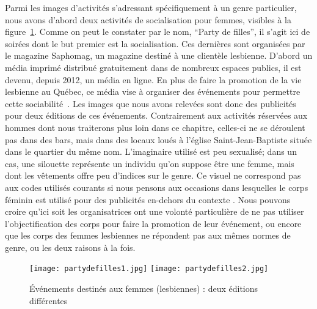 Parmi les images d'activités s'adressant spécifiquement à un genre particulier, nous avons d'abord deux activités de socialisation pour femmes, visibles à la figure~\ref{figs:partydefilles}.
Comme on peut le constater par le nom, \enquote{Party de filles}, il s'agit ici de soirées dont le but premier est la socialisation.
Ces dernières sont organisées par le magazine Saphomag, un magazine destiné à une clientèle lesbienne.
D'abord un média imprimé distribué gratuitement dans de nombreux espaces publics, il est devenu, depuis 2012, un média en ligne.
En plus de faire la promotion de la vie lesbienne au Québec, ce média vise à organiser des événements pour permettre cette sociabilité~\citep{Saphomag2016}.
Les images que nous avons relevées sont donc des publicités pour deux éditions de ces événements.
Contrairement aux activités réservées aux hommes dont nous traiterons plus loin dans ce chapitre, celles-ci ne se déroulent pas dans des bars, mais dans des locaux loués à l'église Saint-Jean-Baptiste située dans le quartier du même nom.
L'imaginaire utilisé est peu sexualisé; dans un cas, une silouette représente un individu qu'on suppose être une femme, mais dont les vêtements offre peu d'indices sur le genre.
Ce visuel ne correspond pas aux codes utilisés courants si nous pensons aux occasions dans lesquelles le corps féminin est utilisé pour des publicités en-dehors du contexte \lgbt{}.
Nous pouvons croire qu'ici soit les organisatrices ont une volonté particulière de ne pas utiliser l'objectification des corps pour faire la promotion de leur événement, ou encore que les corps des femmes lesbiennes ne répondent pas aux mêmes normes de genre, ou les deux raisons à la fois.

\begin{figure}
\centering
{}
{\texttt{[image: partydefilles1.jpg]}}
{\texttt{[image: partydefilles2.jpg]}}
\caption[Événements destinés aux femmes (lesbiennes)]{Événements destinés aux femmes (lesbiennes) : deux éditions différentes}\label{figs:partydefilles}
\end{figure}


